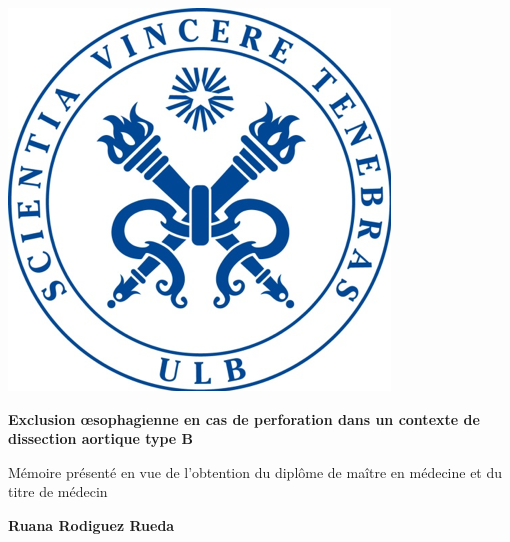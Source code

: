 \documentclass[./tfe.tex]{subfiles}
\begin{document}
\begin{titlepage}

    \begin{center}
    
        \vspace*{2cm}
        
        \includegraphics{images/logo.png}

        \textbf{\huge Exclusion œsophagienne en cas de perforation dans un contexte de dissection aortique type B}

        \vspace*{2cm}

        \large Mémoire présenté en vue de l'obtention du diplôme de maître en médecine et du titre de médecin

        \vspace{3cm}

        \textbf{Ruana Rodiguez Rueda}

        \vspace{1cm}


        \vspace{2cm}
    \end{center}

\end{titlepage}
\end{document}
